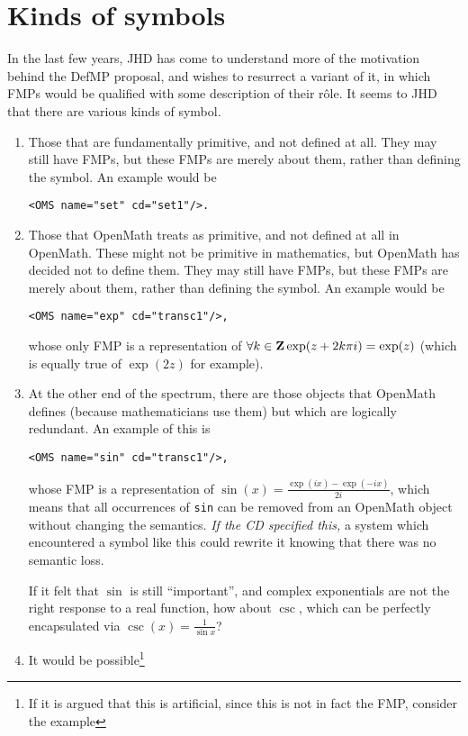 \documentclass[11pt]{openmathTN}
\def\Z{{\bf Z}}
\begin{document}
\section{Kinds of symbols}
In the last few years, JHD has come to understand more of the motivation
behind the DefMP proposal, and wishes to resurrect a variant of it, in
which FMPs would be qualified with some description of their r\^ole. It
seems to JHD that there are various kinds of symbol.
\begin{enumerate}
\item\label{fund}Those that are fundamentally primitive, and not defined at
all. They may still have FMPs, but these FMPs are merely about them, rather
than defining the symbol. An example would be
\begin{verbatim}
<OMS name="set" cd="set1"/>.
\end{verbatim}
\item\label{fund2}Those that OpenMath treats as primitive, and not defined
at all in OpenMath. These might not be primitive in mathematics, but
OpenMath has decided not to define them. They may still have FMPs, but
these FMPs are merely about them, rather than defining the symbol. An
example would be
\begin{verbatim}
<OMS name="exp" cd="transc1"/>,
\end{verbatim}
whose only FMP is a representation of $\forall k\in\Z \exp(z+2k\pi
i)=\exp(z)$ (which is equally true of $\exp(2z)$ for example).
\item\label{utterly}At the other end of the spectrum, there are those
objects that OpenMath defines (because mathematicians use them) but which
are logically redundant. An example of this is
\begin{verbatim}
<OMS name="sin" cd="transc1"/>,
\end{verbatim}
whose FMP is a representation of $\sin(x)=\frac{\exp(ix)-\exp(-ix)}{2i}$,
which means that all occurrences of {\tt sin} can be removed from an
OpenMath object without changing the semantics. {\it If the CD specified
this,\/} a system which encountered a symbol like this could rewrite it
knowing that there was no semantic loss.
\par
If it felt that $\sin$ is still ``important'', and complex exponentials are
not the right response to a real function, how about $\csc$, which can
be perfectly encapsulated via $\csc(x)=\frac1{\sin x}$?
\item\label{recursive}It would be possible\footnote{If it is argued that
this is artificial, since this is not in fact the FMP, consider the example
}
\end{enumerate}
\end{document}
